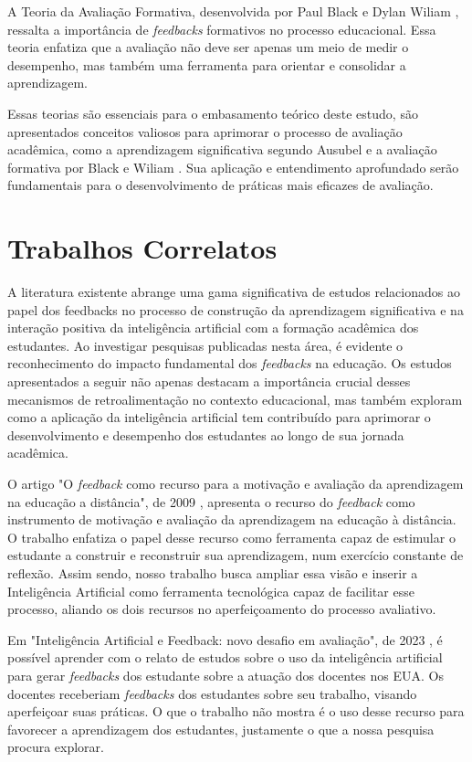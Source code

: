 A Teoria da Avaliação Formativa, desenvolvida por Paul Black e Dylan Wiliam \cite{domingos2006}, ressalta a importância de \textit{feedbacks} formativos no processo educacional. Essa teoria enfatiza que a avaliação não deve ser apenas um meio de medir o desempenho, mas também uma ferramenta para orientar e consolidar a aprendizagem. 

Essas teorias são essenciais para o embasamento teórico deste estudo, são apresentados conceitos valiosos para aprimorar o processo de avaliação acadêmica, como a aprendizagem significativa segundo Ausubel \cite{teorias} e a avaliação formativa por Black e Wiliam \cite{domingos2006}. Sua aplicação e entendimento aprofundado serão fundamentais para o desenvolvimento de práticas mais eficazes de avaliação.

\section{Trabalhos Correlatos}

A literatura existente abrange uma gama significativa de estudos relacionados ao papel dos feedbacks no processo de construção da aprendizagem significativa e na interação positiva da inteligência artificial com a formação acadêmica dos estudantes. Ao investigar pesquisas publicadas nesta área, é evidente o reconhecimento do impacto fundamental dos \textit{feedbacks} na educação. Os estudos apresentados a seguir não apenas destacam a importância crucial desses mecanismos de retroalimentação no contexto educacional, mas também exploram como a aplicação da inteligência artificial tem contribuído para aprimorar o desenvolvimento e desempenho dos estudantes ao longo de sua jornada acadêmica.

O artigo "O \textit{feedback} como recurso para a motivação e
avaliação da aprendizagem na educação a
distância", de 2009 \cite{flores2009}, apresenta o recurso do \textit{feedback} como instrumento de motivação e avaliação da aprendizagem na educação à distância. O trabalho enfatiza o papel desse recurso como ferramenta capaz de estimular o estudante a construir e reconstruir sua aprendizagem, num exercício constante de reflexão. Assim sendo, nosso trabalho busca ampliar essa visão e inserir a Inteligência Artificial como ferramenta tecnológica capaz de facilitar esse processo, aliando os dois recursos no aperfeiçoamento do processo avaliativo.

Em "Inteligência Artificial e Feedback: novo desafio em avaliação", de 2023 \cite{villasboas2023}, é possível aprender com o relato de estudos sobre o uso da inteligência artificial para gerar \textit{feedbacks} dos estudante sobre a atuação dos docentes nos EUA. Os docentes receberiam \textit{feedbacks} dos estudantes sobre seu trabalho, visando aperfeiçoar suas práticas. O que o trabalho não mostra é o uso desse recurso para favorecer a aprendizagem dos estudantes, justamente o que a nossa pesquisa procura explorar.



